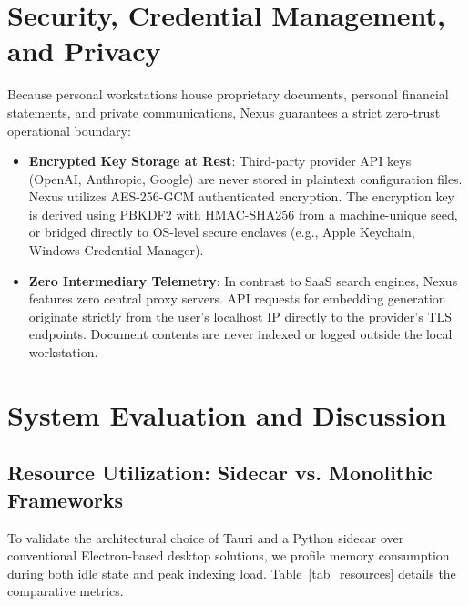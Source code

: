 \documentclass[pdflatex,sn-mathphys-num]{sn-jnl}%
\theoremstyle{thmstyleone}%
\theoremstyle{thmstyletwo}%
\theoremstyle{thmstylethree}%
\begin{document}
\section{Security, Credential Management, and Privacy}\label{sec6}

Because personal workstations house proprietary documents, personal financial statements, and private communications, Nexus guarantees a strict zero-trust operational boundary:
\begin{itemize}
    \item \textbf{Encrypted Key Storage at Rest}: Third-party provider API keys (OpenAI, Anthropic, Google) are never stored in plaintext configuration files. Nexus utilizes AES-256-GCM authenticated encryption. The encryption key is derived using PBKDF2 with HMAC-SHA256 from a machine-unique seed, or bridged directly to OS-level secure enclaves (e.g., Apple Keychain, Windows Credential Manager).
    \item \textbf{Zero Intermediary Telemetry}: In contrast to SaaS search engines, Nexus features zero central proxy servers. API requests for embedding generation originate strictly from the user's localhost IP directly to the provider's TLS endpoints. Document contents are never indexed or logged outside the local workstation.
\end{itemize}

\section{System Evaluation and Discussion}\label{sec7}

\subsection{Resource Utilization: Sidecar vs. Monolithic Frameworks}\label{subsec7_1}
To validate the architectural choice of Tauri and a Python sidecar over conventional Electron-based desktop solutions, we profile memory consumption during both idle state and peak indexing load. Table~\ref{tab_resources} details the comparative metrics.
\end{document}
